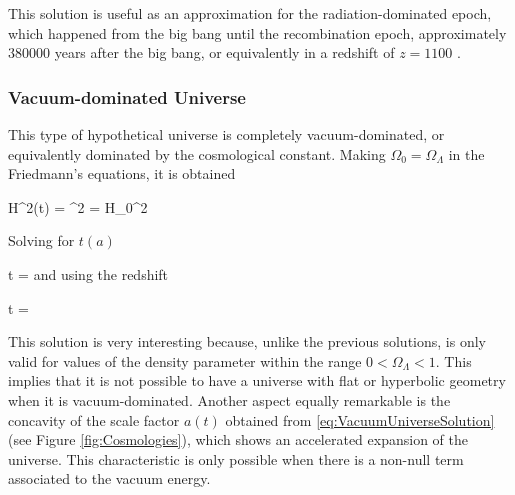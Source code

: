 This solution is useful as an approximation for the radiation-dominated 
epoch, which happened from the big bang until the recombination epoch, 
approximately $380 000$ years after the big bang, or equivalently in a
redshift of $z = 1100$ \cite{padmanabhan1995}.



			\subsubsection*{Vacuum-dominated Universe}
		

This type of hypothetical universe is completely vacuum-dominated, or
equivalently dominated by the cosmological constant. Making $\Omega_0 = 
\Omega_\Lambda$ in the Friedmann's equations, it is obtained
			


{ H^2(t) = ^2 = H_0^2  }


Solving for $t(a)$


{ t = 
\ln{} }
and using the redshift



{ t = 
\ln{} }


This solution is very interesting because, unlike the previous solutions, 
is only valid for values of the density parameter within the range 
$0<\Omega_\Lambda <1$. This implies that it is not possible to have a  
universe with flat or hyperbolic geometry when it is vacuum-dominated.
Another aspect equally remarkable is the concavity of the scale factor 
$a(t)$ obtained from \ref{eq:VacuumUniverseSolution} (see Figure 
\ref{fig:Cosmologies}), which shows an accelerated expansion of the 
universe. This characteristic is only possible when there is a non-null 
term associated to the vacuum energy.


